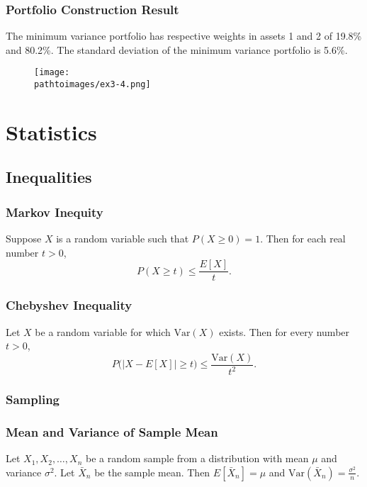 \documentclass{beamer}
\newcommand{\pathtoimages}{/Users/charlesrambo/Desktop/Bootcamp24/Images}
\begin{document}
\begin{frame}
\frametitle{Portfolio Construction Result}
The minimum variance portfolio has respective weights in assets 1 and 2 of 19.8\% and 80.2\%. The standard deviation of the minimum variance portfolio is 5.6\%.
\begin{figure}
\centering
\texttt{[image: \\pathtoimages/ex3-4.png]}
\end{figure}
\end{frame}

\section{Statistics}



\subsection{Inequalities} 

\begin{frame}
\frametitle{Markov Inequity}

\begin{Theorem} 
Suppose $X$ is a random variable such that $P(X\geq 0) = 1$. Then for each real number $t > 0$,
$$
P(X\geq t) \leq \frac{E[X]}{t}.
$$
\end{Theorem}
\end{frame}

\begin{frame}
\frametitle{Chebyshev Inequality}

\begin{Theorem}
Let $X$ be a random variable for which $\text{Var}(X)$ exists. Then for every number $t > 0$,
$$
P\Big(\left| X - E[X]\right| \geq t\Big) \leq \frac{\text{Var}(X)}{t^2}.
$$
\end{Theorem}

\end{frame}

\frametitle{Sampling} 

\begin{frame}
\frametitle{Mean and Variance of Sample Mean}

\begin{Theorem}
Let $X_1, X_2,\ldots, X_n$ be a random sample from a distribution with mean $\mu$ and variance $\sigma^2$. Let $\bar{X}_n$ be the sample mean. Then $E[\bar{X}_n] = \mu$ and $\text{Var}(\bar{X}_n) =\frac{\sigma^2}{n}$.
\end{Theorem}
\end{frame}
\end{document}

